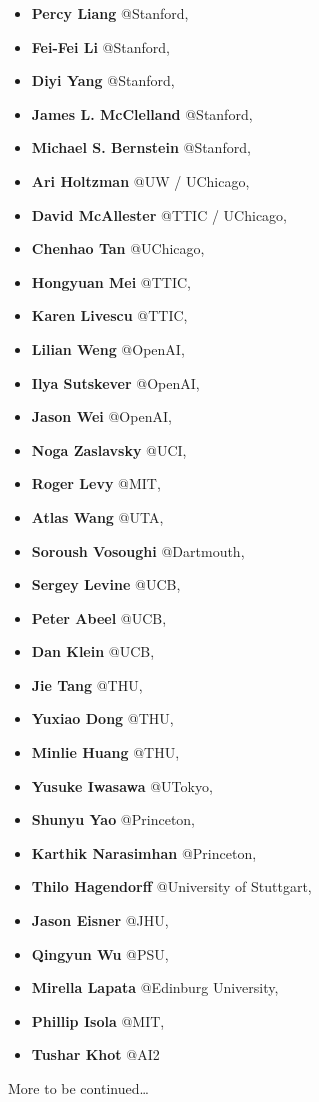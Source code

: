 \documentclass[10pt]{article} %
\begin{document}
\begin{itemize}
\item \textbf{Percy Liang} @Stanford,
\item \textbf{Fei-Fei Li} @Stanford,
\item \textbf{Diyi Yang} @Stanford, 
\item \textbf{James L. McClelland} @Stanford,
\item \textbf{Michael S. Bernstein} @Stanford,
\item \textbf{Ari Holtzman} @UW / UChicago,
\item \textbf{David McAllester} @TTIC / UChicago,
\item \textbf{Chenhao Tan} @UChicago,
\item \textbf{Hongyuan Mei} @TTIC,
\item \textbf{Karen Livescu} @TTIC,
\item \textbf{Lilian Weng} @OpenAI,
\item \textbf{Ilya Sutskever} @OpenAI,
\item \textbf{Jason Wei} @OpenAI,
\item \textbf{Noga Zaslavsky} @UCI,
\item \textbf{Roger Levy} @MIT,
\item \textbf{Atlas Wang} @UTA,
\item \textbf{Soroush Vosoughi} @Dartmouth,
\item \textbf{Sergey Levine} @UCB,
\item \textbf{Peter Abeel} @UCB,
\item \textbf{Dan Klein} @UCB,
\item \textbf{Jie Tang} @THU,
\item \textbf{Yuxiao Dong} @THU,
\item \textbf{Minlie Huang} @THU,
\item \textbf{Yusuke Iwasawa} @UTokyo, 
\item \textbf{Shunyu Yao} @Princeton,
\item \textbf{Karthik Narasimhan} @Princeton,
\item \textbf{Thilo Hagendorff} @University of Stuttgart,
\item \textbf{Jason Eisner} @JHU,
\item \textbf{Qingyun Wu} @PSU,
\item \textbf{Mirella Lapata} @Edinburg University,
\item \textbf{Phillip Isola} @MIT,
\item \textbf{Tushar Khot} @AI2
\end{itemize}


More to be continued…


% 
% 

\end{document}
